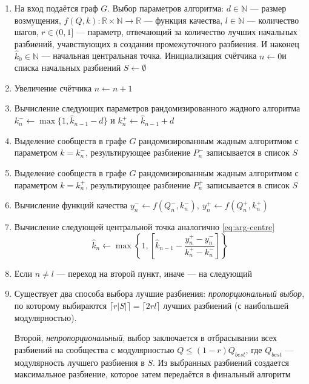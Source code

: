 \begin{enumerate}
	\item На вход подаётся граф $G$. Выбор параметров алгоритма: $d \in \mathbb{N}$ --- размер возмущения, $f(Q, k): \mathbb{R} \times \mathbb{N} \rightarrow \mathbb{R}$ --- функция качества, $l \in \mathbb{N}$ --- количество шагов, $r \in (0, 1]$ --- параметр, отвечающий за количество лучших начальных разбиений, учавствующих в создании промежуточного разбиения. И наконец $\hat{k}_0 \in \mathbb{N}$ --- начальная центральная точка. Инициализация счётчика $n \leftarrow 0$и списка начальных разбиений $S \leftarrow \emptyset$
	\item Увеличение счётчика $n \leftarrow n + 1$
	\item \label{item:es-k+} Вычисление следующих параметров рандомизированного жадного алгоритма $k_n^{-} \leftarrow \max\{1, \hat{k}_{n - 1} - d\}$ и $k_n^{+} \leftarrow \hat{k}_{n - 1} + d$
	\item Выделение сообществ в графе $G$ рандомизированным жадным алгоритмом с параметром $k = k_n^{-}$, результирующее разбиение $P_n^{-}$ записывается в список $S$
	\item Выделение сообществ в графе $G$ рандомизированным жадным алгоритмом с параметром $k = k_n^{+}$, результирующее разбиение $P_n^{+}$ записывается в список $S$
	\item Вычисление функций качества $y_n^{-} \leftarrow f(Q_n^{-}, k_n^{-}),\ y_n^{+} \leftarrow f(Q_n^{+}, k_n^{+})$
	\item Вычисление следующей центральной точка аналогично \eqref{eq:arg-centre}
	\begin{equation}\label{eq:aes-centre}
		\hat{k}_n \leftarrow \max\left\{1, \left[\hat{k}_{n - 1} - \frac{y_n^{+} - y_n^{-}}{k_n^{+} - k_n^{-}}\right]\right\}
	\end{equation}
	\item Если $n \ne l$ --- переход на второй пункт, иначе --- на следующий
	\item Существует два способа выбора лучшие разбиения: \emph{пропорциональный выбор}, по которому выбираются $\lceil r|S| \rceil = \lceil 2rl \rceil$ лучших разбиений (с наибольшей модулярностью).

	Второй, \emph{непропорциональный}, выбор заключается в отбрасывании всех разбиений на сообщества с модулярностью $Q \le (1 - r)Q_{best}$, где $Q_{best}$ --- модулярность лучшего разбиения в $S$. Из выбранных разбиений создается максимальное разбиение, которое затем передаётся в финальный алгоритм
\end{enumerate}

